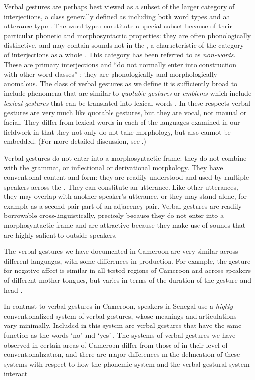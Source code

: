\documentclass[output=paper,newtxmath,modfonts,nonflat,hidelinks]{langsci/langscibook}
\begin{document}
Verbal gestures are perhaps best viewed as a subset of the larger category of interjections, a class generally defined as including both word types and an utterance type \citep[102]{ameka1992}. The word types constitute a special subset because of their particular phonetic and morphosyntactic properties: they are often phonologically distinctive, and may contain sounds not in the ,  a characteristic of the category of interjections as a whole  \citep{schachter1985}. This category has been referred to as \textit{non-words}. These are primary interjections and ``do not normally enter into construction with other word classes''  \citep[105]{ameka1992}; they are phonologically and morphologically anomalous. The class of verbal gestures as we define it is sufficiently broad to include  phenomena that  are similar to \textit{quotable gestures} or \textit{emblems}  which  include\textit{ lexical gestures} that can be translated into lexical words \citep{brookes2004, poggi1983, poggizomparelli1987}. In these respects verbal gestures are very much like quotable gestures, but they are vocal, not manual or facial. They differ from lexical words in each of the languages examined in our fieldwork in that they not only do not take morphology, but also cannot be embedded. (For more detailed discussion, see \citealt{grenobleetal2015}.)  

Verbal gestures do not enter into a morphosyntactic frame: they do not combine with the grammar, or inflectional or derivational morphology. They have conventional content and form: they are  readily understood and used by multiple speakers across the . They  can constitute an utterance. Like other utterances, they may overlap with another speaker's utterance, or they may stand alone, for example as a second-pair part of an adjacency pair.
Verbal gestures are readily borrowable cross-linguistically, precisely because they do not enter into a morphosyntactic frame and are attractive because they make use of sounds that are highly salient to outside speakers. 

The verbal gestures we have documented in Cameroon are very similar across different languages, with some differences in production.  For example, the gesture for negative affect is similar in all tested regions of Cameroon and across speakers of different mother tongues, but varies in terms of the duration of the gesture and head .  

In contrast to verbal gestures in Cameroon,   speakers in Senegal use a \textit{highly} conventionalized system of verbal gestures, whose meanings and articulations vary minimally. Included in this system are verbal gestures that have the same function as the words `no' and `yes' \citep{grenobleetal2015}.  The systems of verbal gestures we have observed in certain areas of Cameroon differ from those of  in their level of conventionalization, and there are major differences in the delineation of these systems with respect to how the phonemic system and the verbal gestural system interact. 
\end{document}
